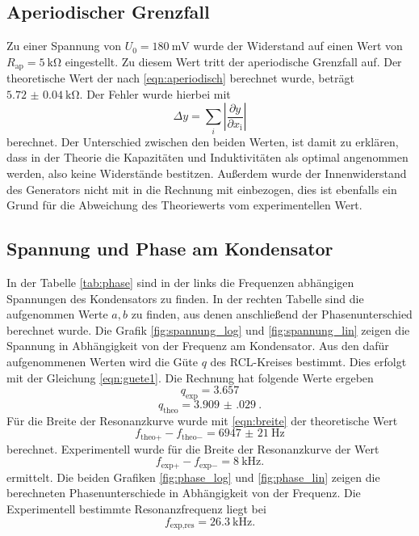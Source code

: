 \subsection{Aperiodischer Grenzfall}
Zu einer Spannung von $U_0 = \SI{180}{\milli\V}$ wurde der Widerstand auf einen Wert von $R_\text{ap} = \SI{5}{\kilo\ohm}$ eingestellt.
Zu diesem Wert tritt der aperiodische Grenzfall auf. Der theoretische Wert der nach \eqref{eqn:aperiodisch} berechnet wurde, beträgt $\SI{5.72(4)}{\kilo\ohm}$.
Der Fehler wurde hierbei mit 
\begin{equation}
    \Delta y = \sum_i \left | \frac{\partial y}{\partial x_\text{i}} \right |
    \label{eqn:fehler}
\end{equation}
berechnet.
Der Unterschied zwischen den beiden Werten, ist damit zu erklären, dass in der Theorie die Kapazitäten und Induktivitäten als optimal angenommen werden, also keine Widerstände bestitzen.
Außerdem wurde der Innenwiderstand des Generators nicht mit in die Rechnung mit einbezogen, dies ist ebenfalls ein Grund für die Abweichung des Theoriewerts vom experimentellen Wert.

\subsection{Spannung und Phase am Kondensator}
In der Tabelle \ref{tab:phase} sind in der links die Frequenzen abhängigen Spannungen des Kondensators zu finden.
In der rechten Tabelle sind die aufgenommen Werte $a, b$ zu finden, aus denen anschließend der Phasenunterschied berechnet wurde.
Die Grafik \ref{fig:spannung_log} und \ref{fig:spannung_lin} zeigen die Spannung in Abhängigkeit von der Frequenz am Kondensator.
Aus den dafür aufgenommenen Werten wird die Güte $q$ des RCL-Kreises bestimmt.
Dies erfolgt mit der Gleichung \eqref{eqn:guete1}. Die Rechnung hat folgende Werte ergeben
\begin{equation*}
    q_\text{exp} = 3.657
\end{equation*}
\begin{equation*}
    q_\text{theo} =  \SI{3.909(029)}{}.
\end{equation*}
Für die Breite der Resonanzkurve wurde mit \eqref{eqn:breite} der theoretische Wert 
\begin{equation*}
    f_{\text{theo}+}- f_{\text{theo}-} = \SI{6947(21)}{\hertz}
\end{equation*}
berechnet.
Experimentell wurde für die Breite der Resonanzkurve der Wert 
\begin{equation*}
    f_{\text{exp}+}-f_{\text{exp}-} = \SI{8}{\kilo\hertz}.
\end{equation*}
ermittelt.
Die beiden Grafiken \ref{fig:phase_log} und \ref{fig:phase_lin} zeigen die berechneten Phasenunterschiede in Abhängigkeit von der Frequenz.
Die Experimentell bestimmte Resonanzfrequenz liegt bei 
\begin{equation*}
    f_{\text{exp},\text{res}} = \SI{26.3}{\kilo\hertz}.
\end{equation*}

